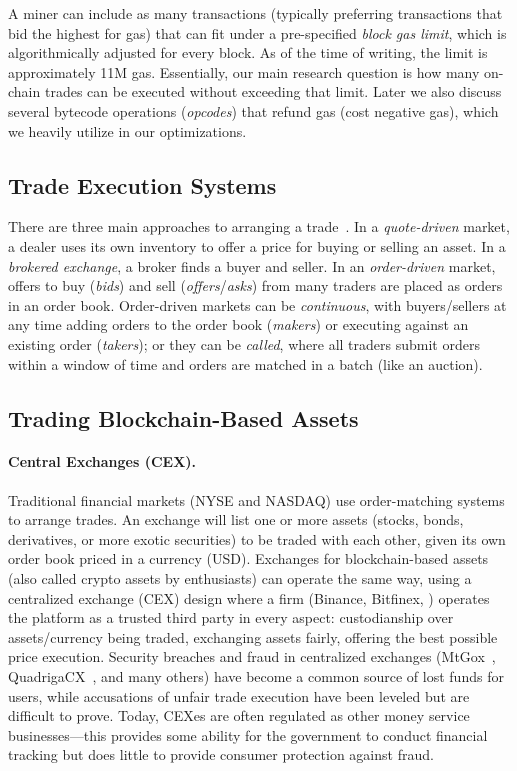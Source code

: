 A miner can include as many transactions (typically preferring transactions that bid the highest for gas) that can fit under a pre-specified \textit{block gas limit}, which is algorithmically adjusted for every block. As of the time of writing, the limit is approximately 11M gas. Essentially, our main research question is how many on-chain trades can be executed without exceeding that limit. Later we also discuss several bytecode operations (\emph{opcodes}) that refund gas (\ie cost negative gas), which we heavily utilize in our optimizations.

\subsection{Trade Execution Systems}

 There are three main approaches to arranging a trade~\cite{Har03}. In a \emph{quote-driven} market, a dealer uses its own inventory to offer a price for buying or selling an asset. In a \emph{brokered exchange}, a broker finds a buyer and seller. In an \emph{order-driven} market, offers to buy (\emph{bids}) and sell (\emph{offers}/\emph{asks}) from many traders are placed as orders in an order book. Order-driven markets can be \emph{continuous}, with buyers/sellers at any time adding orders to the order book (\emph{makers}) or executing against an existing order (\emph{takers}); or they can be \emph{called}, where all traders submit orders within a window of time and orders are matched in a batch (like an auction). 

\subsection{Trading Blockchain-Based Assets}

%

\paragraph{Central Exchanges (CEX).} Traditional financial markets (\eg NYSE and NASDAQ) use order-matching systems to arrange trades. An exchange will list one or more assets (stocks, bonds, derivatives, or more exotic securities) to be traded with each other, given its own order book priced in a currency (\eg USD). Exchanges for blockchain-based assets (also called crypto assets by enthusiasts) can operate the same way, using a centralized exchange (CEX) design where a firm (\eg Binance, Bitfinex, \etc) operates the platform as a trusted third party in every aspect: custodianship over assets/currency being traded, exchanging assets fairly, offering the best possible price execution. Security breaches and fraud in centralized exchanges  (\eg MtGox~\cite{TheHisto45:online}, QuadrigaCX~\cite{SEBIOrde83:online}, and many others) have become a common source of lost funds for users, while accusations of unfair trade execution have been leveled but are difficult to prove. Today, CEXes are often regulated as other money service businesses---this provides some ability for the government to conduct financial tracking but does little to provide consumer protection against fraud. 

